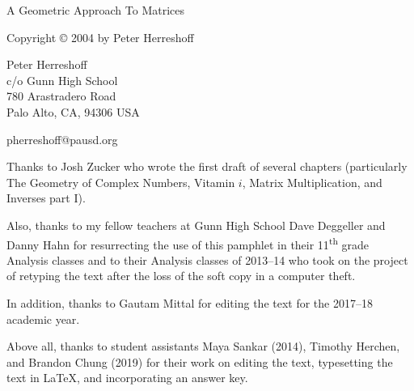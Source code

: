\documentclass[../gatm.tex]{subfiles}
\begin{document}
\newcommand\dnew{\vspace{1cm}}

\begin{center}
	\vspace*{\fill}

	\doublespacing
	A Geometric Approach To Matrices

	Copyright \copyright{} 2004 by Peter Herreshoff  %

	\vspace{1cm}

	Peter Herreshoff\\
	c/o Gunn High School\\
	780 Arastradero Road\\
	Palo Alto, CA, 94306 USA

	\vspace{.5cm}

	pherreshoff@pausd.org

	\vspace{1cm}
\end{center}

\noindent Thanks to Josh Zucker who wrote the first draft of several chapters (particularly The Geometry of Complex Numbers,%
Vitamin $i$, Matrix Multiplication, and Inverses part I).

Also, thanks to my fellow teachers at Gunn High School Dave Deggeller and Danny Hahn for resurrecting the use of this %
pamphlet in their 11\textsuperscript{th} grade Analysis classes and to their Analysis classes of 2013--14 who took on %
the project of retyping the text after the loss of the soft copy in a computer theft.

In addition, thanks to Gautam Mittal for editing the text for the 2017--18 academic year.

Above all, thanks to student assistants Maya Sankar (2014), Timothy Herchen, and Brandon Chung (2019) for their work %
on editing the text, typesetting the text in \LaTeX{}, and incorporating an answer key.

\vspace*{\fill}
\end{document}
